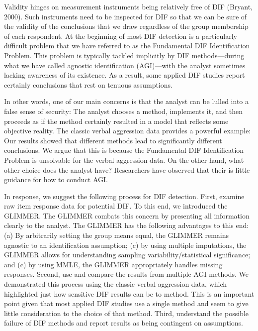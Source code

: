 \documentclass[
  english,
  man,floatsintext]{apa6}
\begin{document}
Validity hinges on measurement instruments being relatively free of DIF (Bryant, 2000). Such instruments need to be inspected for DIF so that we can be sure of the validity of the conclusions that we draw regardless of the group membership of each respondent. At the beginning of most DIF detection is a particularly difficult problem that we have referred to as the Fundamental DIF Identification Problem. This problem is typically tackled implicitly by DIF methods---during what we have called agnostic identification (AGI)---with the analyst sometimes lacking awareness of its existence. As a result, some applied DIF studies report certainly conclusions that rest on tenuous assumptions.

In other words, one of our main concerns is that the analyst can be lulled into a false sense of security: The analyst chooses a method, implements it, and then proceeds as if the method certainly resulted in a model that reflects some objective reality. The classic verbal aggression data provides a powerful example: Our results showed that different methods lead to significantly different conclusions. We argue that this is because the Fundamental DIF Identification Problem is unsolvable for the verbal aggression data. On the other hand, what other choice does the analyst have? Researchers have observed that their is little guidance for how to conduct AGI.

In response, we suggest the following process for DIF detection. First, examine raw item response data for potential DIF. To this end, we introduced the GLIMMER. The GLIMMER combats this concern by presenting all information clearly to the analyst. The GLIMMER has the following advantages to this end: (a) By arbitrarily setting the group means equal, the GLIMMER remains agnostic to an identification assumption; (c) by using multiple imputations, the GLIMMER allows for understanding sampling variability/statistical significance; and (c) by using MMLE, the GLIMMER appropriately handles missing responses. Second, use and compare the results from multiple AGI methods. We demonstrated this process using the classic verbal aggression data, which highlighted just how sensitive DIF results can be to method. This is an important point given that most applied DIF studies use a single method and seem to give little consideration to the choice of that method. Third, understand the possible failure of DIF methods and report results as being contingent on assumptions.
\end{document}
